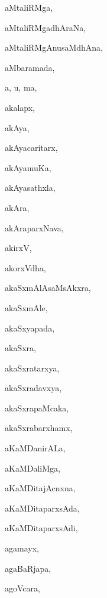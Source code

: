 \begin{multicols}{3}
{\noindent
{aMtaliRMga}, \pageref{aMtaliRMga}

\noindent
{aMtaliRMgadhAraNa}, \pageref{aMtaliRMgadhAraNa}

\noindent
{aMtaliRMgAnusaMdhAna}, \pageref{aMtaliRMgAnusaMdhAna}

\noindent
{aMbaramada}, \pageref{aMbaramada}

\noindent
{a, u, ma}, \pageref{a, u, ma}

\noindent
{akalapx}, \pageref{akalapx}

\noindent
{akAya}, \pageref{akAya}

\noindent
{akAyacaritarx}, \pageref{akAyacaritarx}

\noindent
{akAyamuKa}, \pageref{akAyamuKa}

\noindent
{akAyasathxla}, \pageref{akAyasathxla}

\noindent
{akAra}, \pageref{akAra}

\noindent
{akAraparxNava}, \pageref{akAraparxNava}

\noindent
{akirxV}, \pageref{akirxV}

\noindent
{akorxVdha}, \pageref{akorxVdha}

\noindent
{akaSxmAlAsaMsAkxra}, \pageref{akaSxmAlAsaMsAkxra}

\noindent
{akaSxmAle}, \pageref{akaSxmAle}

\noindent
{akaSxyapada}, \pageref{akaSxyapada}

\noindent
{akaSxra}, \pageref{akaSxra}

\noindent
{akaSxratarxya}, \pageref{akaSxratarxya}

\noindent
{akaSxradavxya}, \pageref{akaSxradavxya}

\noindent
{akaSxrapaMcaka}, \pageref{akaSxrapaMcaka}

\noindent
{akaSxrabarxhamx}, \pageref{akaSxrabarxhamx}

\noindent
{aKaMDanirALa}, \pageref{aKaMDanirALa}

\noindent
{aKaMDaliMga}, \pageref{aKaMDaliMga}

\noindent
{aKaMDitajAcnxna}, \pageref{aKaMDitajAcnxna}

\noindent
{aKaMDitaparxsAda}, \pageref{aKaMDitaparxsAda}

\noindent
{aKaMDitaparxsAdi}, \pageref{aKaMDitaparxsAdi}

\noindent
{agamayx}, \pageref{agamayx}

\noindent
{agaBaRjapa}, \pageref{agaBaRjapa}

\noindent
{agoVcara}, \pageref{agoVcara}

}
\end{multicols}
